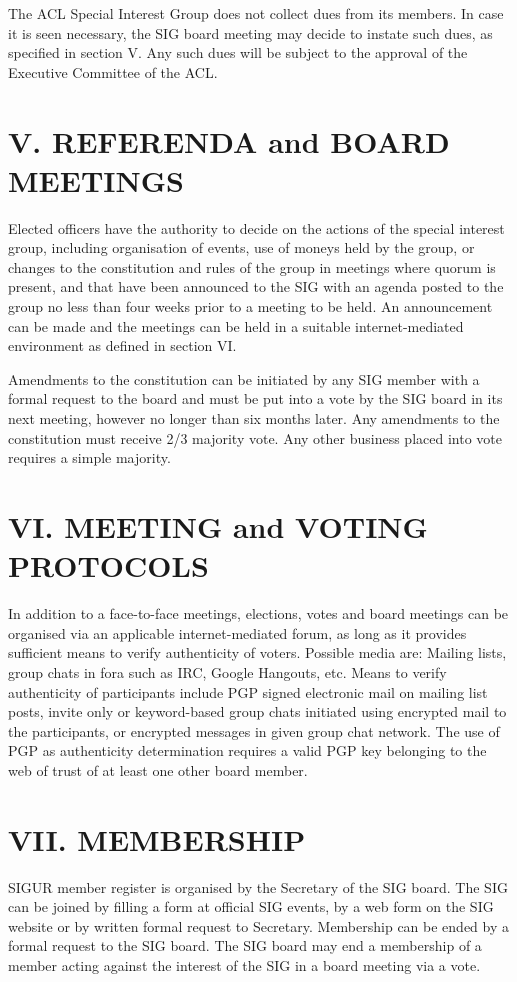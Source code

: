 \documentclass[11pt,a4paper]{article}
\begin{document}
The ACL Special Interest Group does not collect dues from its members. In case it is seen necessary, the SIG board meeting may decide to instate such dues, as specified in section V. Any such dues will be subject to the approval of the Executive Committee of the ACL.

\section*{V. REFERENDA and BOARD MEETINGS}

Elected officers have the authority to decide on the actions of the special interest group, including organisation of events, use of moneys held by the group, or changes to the constitution and rules of the group in meetings where quorum is present, and that have been announced to the SIG with an agenda posted to the group no less than four weeks prior to a meeting to be held. An announcement can be made and the meetings can be held in a suitable internet-mediated environment as defined in section VI.

Amendments to the constitution can be initiated by any SIG member with a formal request to the board and must be put into a vote by the SIG board in its next meeting, however no longer than six months later. Any amendments to the constitution must receive 2/3 majority vote. Any other business placed into vote requires a simple majority.

\section*{VI. MEETING and VOTING PROTOCOLS}

In addition to a face-to-face meetings, elections, votes and board meetings can be organised via an applicable internet-mediated forum, as long as it provides sufficient means to verify authenticity of voters. Possible media are: Mailing lists, group chats in fora such as IRC, Google Hangouts, etc. Means to verify authenticity of participants include PGP signed electronic mail on mailing list posts, invite only or keyword-based group chats initiated using encrypted mail to the participants, or encrypted messages in given group chat network. The use of PGP as authenticity determination requires a valid PGP key belonging to the web of trust of at least one other board member.

\section*{VII. MEMBERSHIP}

SIGUR member register is organised by the Secretary of the SIG board. The SIG can be joined by filling a form at official SIG events, by a web form on the SIG website or by written formal request to Secretary. Membership can be ended by a formal request to the SIG board. The SIG board may end a membership of a member acting against the interest of the SIG in a board meeting via a vote.

\end{document}
